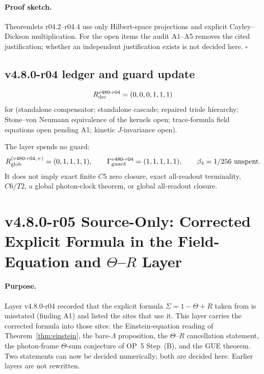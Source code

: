 \paragraph{Proof sketch.}
Theoremlets r04.2--r04.4 use only Hilbert-space projections and explicit Cayley--Dickson
multiplication.  For the open items the audit A1--A5 removes the cited justification; whether
an independent justification exists is not decided here.  \(\square\)

\subsection*{v4.8.0-r04 ledger and guard update}
\label{subsec:v480-r04-ledger-guard}

\[
R_{\rm dec}^{v480\text{-}r04}=(0,0,0,1,1,1)
\]
for (standalone compensator; standalone cascade; repaired triole hierarchy; Stone--von Neumann
equivalence of the kernels open; trace-formula field equations open pending A1; kinetic
\(J\)-invariance open).

The layer spends no guard:
\[
R_{\rm glob}^{(v480\text{-}r04,+)}=(0,1,1,1,1),
\qquad
\Gamma_{\rm guard}^{v480\text{-}r04}=(1,1,1,1,1),
\qquad
\beta_4=1/256\ \text{unspent}.
\]
It does not imply exact finite \(C5\) zero closure, exact all-readout terminality,
\(C6/T2\), a global photon-clock theorem, or global all-readout closure.


\clearpage
\section*{v4.8.0-r05 Source-Only: Corrected Explicit Formula in the Field-Equation and \texorpdfstring{$\Theta$}{Theta}--\texorpdfstring{$R$}{R} Layer}
\label{sec:v480-r05-corrected-explicit-formula}

\paragraph{Purpose.}
Layer v4.8.0-r04 recorded that the explicit formula \(\Sigma=1-\Theta+R\) taken from
\cite{brendecke2026rh} is misstated (finding A1) and listed the sites that use it.  This layer
carries the corrected formula into those sites: the Einstein-equation reading of
Theorem~\ref{thm:einstein}, the bare-\(\Lambda\) proposition, the \(\Theta\)--\(R\) cancellation
statement, the photon-frame \(\Theta\)-sum conjecture of OP~5 Step~(B), and the GUE theorem.
Two statements can now be decided numerically; both are decided here.  Earlier layers are not
rewritten.

